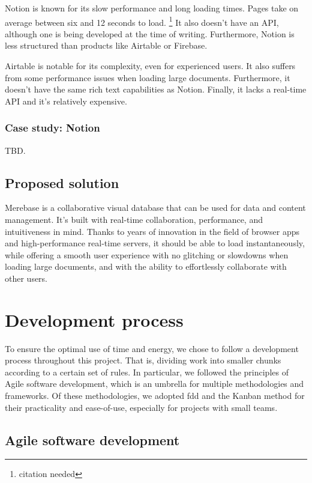 Notion is known for its slow performance and long loading times. Pages
take on average between six and 12 seconds to load. \footnote{citation
	needed} It also doesn't have an API, although one is being developed
at the time of writing. Furthermore, Notion is less structured than
products like Airtable or Firebase.

Airtable is notable for its complexity, even for experienced users. It
also suffers from some performance issues when loading large documents.
Furthermore, it doesn't have the same rich text capabilities as Notion.
Finally, it lacks a real-time API and it's relatively expensive.

\subsubsection{Case study: Notion}

TBD.

\subsection{Proposed solution}

Merebase is a collaborative visual database that can be used for data
and content management. It's built with real-time collaboration,
performance, and intuitiveness in mind. Thanks to years of innovation in
the field of browser apps and high-performance real-time servers, it
should be able to load instantaneously, while offering a smooth user
experience with no glitching or slowdowns when loading large documents,
and with the ability to effortlessly collaborate with other users.

\section{Development process}

To ensure the optimal use of time and energy, we chose to follow a development process throughout this project.
That is, dividing work into smaller chunks according to a certain set of rules. In particular, we followed the principles of Agile software development, which is an umbrella for multiple methodologies and frameworks.
Of these methodologies, we adopted \acrfull{fdd} and the Kanban method for their practicality and ease-of-use, especially for projects with small teams.

\subsection{Agile software development}

